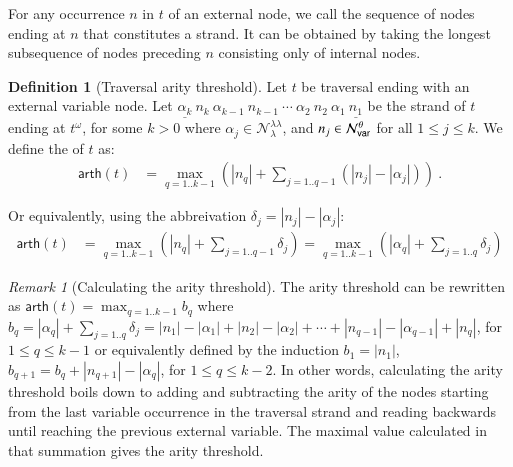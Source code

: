 \documentclass{elsarticle}
\theoremstyle{plain}
\theoremstyle{definition}
\newtheorem{definition}{Definition}[section]
\theoremstyle{remark}
\newtheorem{remark}{Remark}[section]
\newcommand\Nodes{\mathcal{N}}%
\newcommand\NodesVar{\Nodes_{\sf var}}%
\newcommand\NodesLmd{\Nodes_\lambda}%
\newcommand{\ghostlmd}{{\lambda\!\!\lambda}}
\newcommand{\ghostvar}{\theta}
\newcommand\ImNodesVar{\NodesVar^\ghostvar}
\newcommand\ImNodesLmd{\NodesLmd^\ghostlmd}
\newcommand\arth{\textsf{arth}} %
\begin{document}
For any occurrence $n$ in $t$ of an external node, we call  the sequence of nodes ending at $n$ that constitutes a strand. It can be obtained by taking the longest subsequence of nodes preceding $n$ consisting only of internal nodes.

\begin{definition}[Traversal arity threshold]
\label{dfn:arity-threshold}
Let $t$ be traversal ending with an external variable node.
Let $\underline{\alpha_k}\ n_k\ \alpha_{k-1}\ n_{k-1}\ \cdots\ \alpha_2\ n_2\ \alpha_1\ \underline{n_1}$ be the strand of $t$ ending at $t^\omega$, for some $k>0$  where $\alpha_j \in \ImNodesLmd$, and $n_j \in \ImNodesVar$ for all $1\leq j\leq k$.
We define the  of $t$ as:
\begin{align*}
\arth(t) &= \max_{q=1..k-1} \left( |n_q| + \sum_{j=1..q-1} (|n_j| - |\alpha_j|) \right)\ .
\end{align*}
\end{definition}

Or equivalently, using the abbreivation $ \delta_j = |n_j| - |\alpha_j|$:
\begin{align*}
    \arth(t) &= \max_{q=1..k-1} \left( |n_q| + \sum_{j=1..q-1} \delta_j \right)     = \max_{q=1..k-1} \left( |\alpha_q| + \sum_{j=1..q} \delta_j\right)
\end{align*}


\begin{remark}[Calculating the arity threshold]
The arity threshold can be rewritten as
$\arth(t) = \max_{q=1..k-1} b_q$
where $b_q = |\alpha_q| + \sum_{j=1..q} \delta_j = |n_1| - |\alpha_1| + |n_2| - |\alpha_2| + \cdots + |n_{q-1}| - |\alpha_{q-1}| + |n_q|$, for $1\leq q\leq k-1$ or equivalently defined by the induction
 $b_1 = |n_1|$, $b_{q+1} = b_q + |n_{q+1}| - |\alpha_q|$, for $1 \leq q \leq k-2$.
In other words, calculating the arity threshold boils down to  adding and subtracting the arity of the nodes starting from the last variable occurrence in the traversal strand and reading backwards until reaching the previous external variable. The maximal value calculated in that summation gives the arity threshold.
\end{remark}
\end{document}
